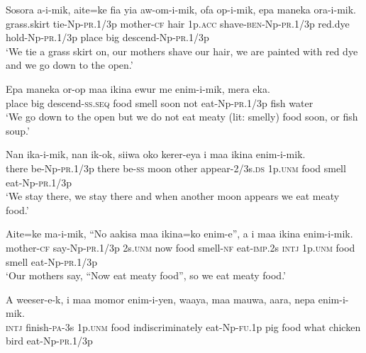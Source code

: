 \ea\label{ex:a:x15}
\gll  Sosora  a-i-mik,  aite=ke  fia  yia  aw-om-i-mik,                      ofa  op-i-mik,  epa  maneka  ora-i-mik. \\
grass.skirt  tie-Np-\textsc{pr}.1/3p  mother-\textsc{cf}  hair  1p.\textsc{acc}  shave-\textsc{ben}-Np-\textsc{pr}.1/3p   red.dye  hold-Np-\textsc{pr}.1/3p  place  big  descend-Np-\textsc{pr}.1/3p \\


\glt ‘We tie a grass skirt on, our mothers shave our hair, we are painted with red dye and we go down to the open.’ \\
\z


\ea\label{ex:a:x16}
\gll  Epa  maneka  or-op  maa  ikina  ewur  me  enim-i-mik,         mera  eka. \\
place  big  descend-\textsc{ss.seq}  food  smell  soon  not  eat-Np-\textsc{pr}.1/3p  fish  water \\


\glt ‘We go down to the open but we do not eat meaty (lit: smelly) food soon, or fish soup.’ \\
\z


\ea\label{ex:a:x17}
\gll  Nan  ika-i-mik,  nan  ik-ok,  siiwa  oko  kerer-eya  i             maa  ikina  enim-i-mik. \\
there  be-Np-\textsc{pr}.1/3p  there  be-\textsc{ss}  moon  other  appear-2/3s.\textsc{ds}  1p.\textsc{unm}  food  smell  eat-Np-\textsc{pr}.1/3p \\


\glt ‘We stay there, we stay there and when another moon appears we eat meaty food.’ \\
\z


\ea\label{ex:a:x18}
\gll  Aite=ke  ma-i-mik,  “No  aakisa  maa  ikina=ko  enim-e”,  a        i  maa  ikina  enim-i-mik. \\
mother-\textsc{cf}  say-Np-\textsc{pr}.1/3p  2s.\textsc{unm}  now  food  smell-\textsc{nf}  eat-\textsc{imp}.2s  \textsc{intj} 1p.\textsc{unm}  food  smell  eat-Np-\textsc{pr}.1/3p \\


\glt ‘Our mothers say, “Now eat meaty food”, so we eat meaty food.’ \\
\z


\ea\label{ex:a:x19}
\gll  A  weeser-e-k,  i  maa  momor  enim-i-yen,  waaya,                maa  mauwa,  aara,  nepa  enim-i-mik. \\
\textsc{intj}  finish-\textsc{pa}-3s  1p.\textsc{unm}  food  indiscriminately  eat-Np-\textsc{fu}.1p  pig   food  what  chicken  bird  eat-Np-\textsc{pr}.1/3p \\


